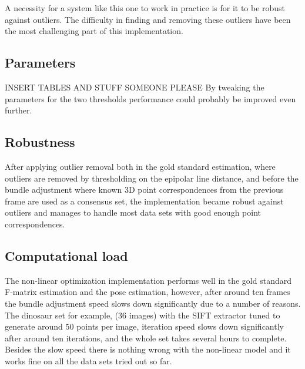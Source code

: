 A necessity for a system like this one to work in practice is for it to be robust against outliers. The difficulty in finding and removing these outliers have been the most challenging part of this implementation.

\subsection{Parameters}
INSERT TABLES AND STUFF SOMEONE PLEASE
By tweaking the parameters for the two thresholds performance could probably be improved even further.

\subsection{Robustness}
After applying outlier removal both in the gold standard estimation, where outliers are removed by thresholding on the epipolar line distance, and before the bundle adjustment where known 3D point correspondences from the previous frame are used as a consensus set, the implementation became robust against outliers and manages to handle most data sets with good enough point correspondences. 

\subsection{Computational load}
The non-linear optimization implementation performs well in the gold standard F-matrix estimation and the pose estimation, however, after around ten frames the bundle adjustment speed slows down significantly due to a number of reasons. The dinosaur set for example, (36 images) with the SIFT extractor tuned to generate around 50 points per image, iteration speed slows down significantly after around ten iterations, and the whole set takes several hours to complete. Besides the slow speed there is nothing wrong with the non-linear model and it works fine on all the data sets tried out so far.